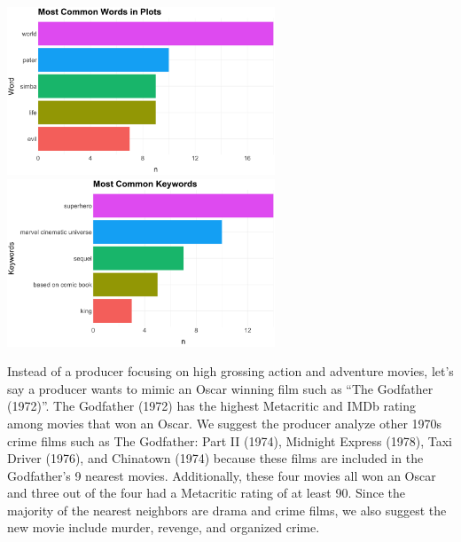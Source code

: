 \documentclass[10pt]{article}
\begin{document}
\begin{center}
\includegraphics[width=8cm]{_assets/_assets_knn/star_wars_common_words.png}
\hspace{1cm}
\includegraphics[width=8cm]{_assets/_assets_knn/star_wars_common_keywords.png}

\end{center}

Instead of a producer focusing on high grossing action and adventure movies, let’s say a producer wants to mimic an Oscar winning film such as “The Godfather (1972)”. The Godfather (1972) has the highest Metacritic and IMDb rating among movies that won an Oscar. We suggest the producer analyze other 1970s crime films such as The Godfather: Part II (1974), Midnight Express (1978), Taxi Driver (1976), and Chinatown (1974) because these films are included in the Godfather’s 9 nearest movies. Additionally, these four movies all won an Oscar and three out of the four had a Metacritic rating of at least 90. Since the majority of the nearest neighbors are drama and crime films, we also suggest the new movie include murder, revenge, and organized crime.
\end{document}
